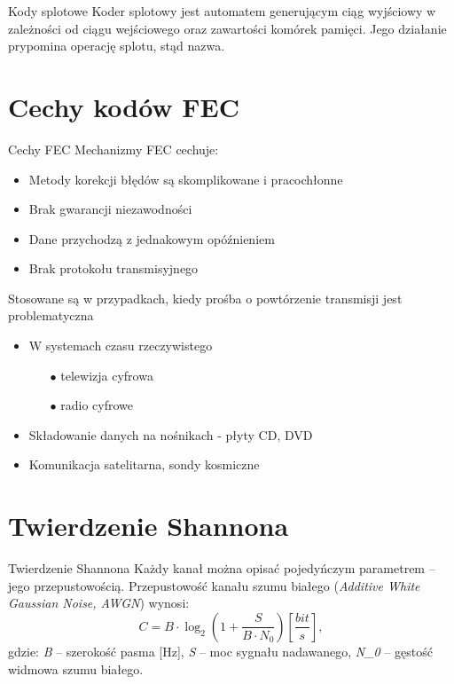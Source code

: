 \documentclass[12pt]{beamer}
\begin{document}
\begin{frame}{Kody splotowe}
Koder splotowy jest automatem generującym ciąg wyjściowy w zależności od ciągu wejściowego oraz zawartości komórek pamięci. Jego działanie prypomina operację splotu, stąd nazwa.
\end{frame}

\section{Cechy kodów FEC}
\begin{frame}{Cechy FEC}
Mechanizmy FEC cechuje:
\begin{itemize}
	\item Metody korekcji błędów są skomplikowane i pracochłonne
	\item Brak gwarancji niezawodności
	\item Dane przychodzą z jednakowym opóźnieniem
	\item Brak protokołu transmisyjnego
\end{itemize}
Stosowane są w przypadkach, kiedy prośba o powtórzenie transmisji jest problematyczna
\begin{itemize}
	\item W systemach czasu rzeczywistego
	\begin{itemize}
		\item[$\bullet$] telewizja cyfrowa
		\item[$\bullet$] radio cyfrowe		
	\end{itemize}
	\item Składowanie danych na nośnikach - płyty CD, DVD
	\item Komunikacja satelitarna, sondy kosmiczne
\end{itemize}
\end{frame}

\section{Twierdzenie Shannona}
\begin{frame}{Twierdzenie Shannona}
Każdy kanał można opisać pojedyńczym parametrem -- jego przepustowością.
Przepustowość kanału szumu białego (\emph{Additive White Gaussian Noise, AWGN}) wynosi:
\begin{equation}
C=B\cdot\log_2(1+\frac{S}{B \cdot N_0}) [\frac{bit}{s}],
\end{equation}
gdzie: \emph{B} -- szerokość pasma [Hz], \emph{S} -- moc sygnału nadawanego,
\emph{N_{0}} -- gęstość widmowa szumu białego.\\\\

\end{frame}
\end{document}
